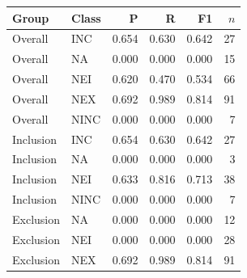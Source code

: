 \begin{tabular}{llrrrr}
\toprule
Group & Class & P & R & F1 & $n$\\
\midrule
Overall & INC & 0.654 & 0.630 & 0.642 & 27\\
Overall & NA & 0.000 & 0.000 & 0.000 & 15\\
Overall & NEI & 0.620 & 0.470 & 0.534 & 66\\
Overall & NEX & 0.692 & 0.989 & 0.814 & 91\\
Overall & NINC & 0.000 & 0.000 & 0.000 & 7\\
\midrule
Inclusion & INC & 0.654 & 0.630 & 0.642 & 27\\
Inclusion & NA & 0.000 & 0.000 & 0.000 & 3\\
Inclusion & NEI & 0.633 & 0.816 & 0.713 & 38\\
Inclusion & NINC & 0.000 & 0.000 & 0.000 & 7\\
\midrule
Exclusion & NA & 0.000 & 0.000 & 0.000 & 12\\
Exclusion & NEI & 0.000 & 0.000 & 0.000 & 28\\
Exclusion & NEX & 0.692 & 0.989 & 0.814 & 91\\
\bottomrule
\end{tabular}
